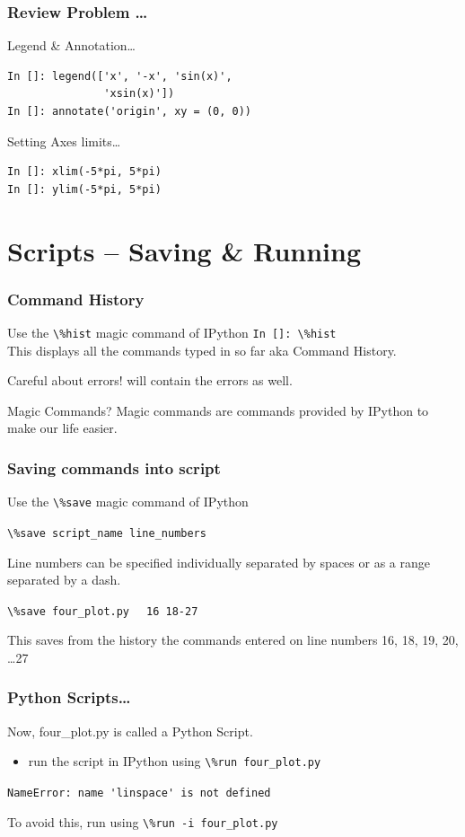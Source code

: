 \documentclass[14pt,compress]{beamer}
\newcommand{\typ}[1]{\lstinline{#1}}
\newcommand{\kwrd}[1]{ \texttt{\textbf{\color{blue}{#1}}}  }
\begin{document}
\begin{frame}[fragile]
\frametitle{Review Problem \ldots}
\alert{Legend \& Annotation\ldots}
\begin{lstlisting}
In []: legend(['x', '-x', 'sin(x)', 
               'xsin(x)'])
In []: annotate('origin', xy = (0, 0))
\end{lstlisting}
\alert{Setting Axes limits\ldots}
\begin{lstlisting}
In []: xlim(-5*pi, 5*pi)
In []: ylim(-5*pi, 5*pi)
\end{lstlisting}
\end{frame}

\section{Scripts -- Saving \& Running}
\begin{frame}[fragile]
\frametitle{Command History}
Use the \typ{\%hist} \alert{magic} command of IPython 
\typ{In []: \%hist}\\
This displays all the commands typed in so far aka Command History.
\begin{block}{Careful about errors!}
  \kwrd{\%hist} will contain the errors as well.\\
\end{block}
\pause
\begin{block}{Magic Commands?}
  Magic commands are commands provided by IPython to make our life easier.
\end{block}
\end{frame}

\begin{frame}[fragile]
  \frametitle{Saving commands into script}
Use the \typ{\%save} \alert{magic} command of IPython
\begin{block}{}
\typ{\%save script_name line_numbers}
\end{block}
Line numbers can be specified individually separated by spaces or as a range separated by a dash.\\
\begin{block}{}
\typ{\%save four_plot.py} \alert{\typ{  16 18-27}} \\  
\end{block}
This saves from the history the commands entered on line numbers \alert{16, 18, 19, 20, \ldots 27}
\end{frame}

\begin{frame}
\frametitle{Python Scripts\ldots}
Now, four\_plot.py is called a Python Script.
 \begin{itemize}
 \item run the script in IPython using \typ{\%run four_plot.py}\\
 \end{itemize}
\pause
\alert{\typ{NameError: name 'linspace' is not defined}}
\begin{block}{}
To avoid this, run using \alert{\typ{\%run -i four_plot.py}}\\
\end{block}
\end{frame}
\end{document}
